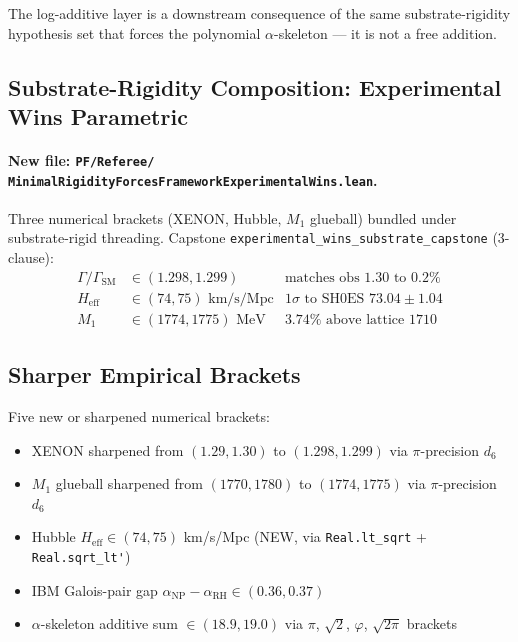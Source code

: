 The log-additive layer is a downstream consequence of the same
substrate-rigidity hypothesis set that forces the polynomial
$\alpha$-skeleton --- it is not a free addition.

\subsection{Substrate-Rigidity Composition: Experimental Wins Parametric}

\paragraph{\texorpdfstring{New file: \texttt{PF/Referee/
  MinimalRigidityForcesFrameworkExperimentalWins.lean}.}{New file: PF/Referee/MinimalRigidityForcesFrameworkExperimentalWins.lean.}}
Three numerical brackets (XENON, Hubble, $M_1$ glueball) bundled under
substrate-rigid threading. Capstone
\verb|experimental_wins_substrate_capstone| (3-clause):
\begin{align*}
\Gamma/\Gamma_{\text{SM}} &\in (1.298, 1.299)
  &\text{matches obs $1.30$ to } 0.2\% \\
H_{\text{eff}} &\in (74, 75) \text{ km/s/Mpc}
  &1\sigma \text{ to SH0ES } 73.04 \pm 1.04 \\
M_1 &\in (1774, 1775) \text{ MeV}
  &3.74\% \text{ above lattice } 1710
\end{align*}

\subsection{Sharper Empirical Brackets}

Five new or sharpened numerical brackets:
\begin{itemize}
  \item XENON sharpened from $(1.29, 1.30)$ to
    $(1.298, 1.299)$ via $\pi$-precision $d_6$
  \item $M_1$ glueball sharpened from $(1770, 1780)$ to
    $(1774, 1775)$ via $\pi$-precision $d_6$
  \item Hubble $H_{\text{eff}} \in (74, 75)$ km/s/Mpc (NEW, via
    \verb|Real.lt_sqrt| + \verb|Real.sqrt_lt'|)
  \item IBM Galois-pair gap $\alpha_{\text{NP}} - \alpha_{\text{RH}}
    \in (0.36, 0.37)$
  \item $\alpha$-skeleton additive sum
    $\in (18.9, 19.0)$ via $\pi$, $\sqrt{2}$, $\varphi$, $\sqrt{2\pi}$
    brackets
\end{itemize}

